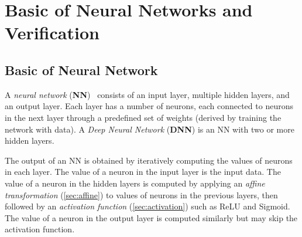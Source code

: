 \part{Basic of Neural Networks and Verification}
\chapter{Basic of Neural Network}\label{sec:basic}

A \emph{neural network} (\textbf{NN})~\cite{Goodfellow-et-al-2016} consists of an input layer, multiple hidden layers, and an output layer. Each layer has a number of neurons, each connected to neurons in the next layer through a predefined set of weights (derived by training the network with data). A \emph{Deep Neural Network} (\textbf{DNN}) is an NN with two or more hidden layers. 


The output of an NN is obtained by iteratively computing  the  values  of  neurons  in  each  layer.
The value of a neuron in the input layer is the input data. The value of a neuron in the hidden layers is computed by applying an \emph{affine transformation} (\autoref{sec:affine}) to values of neurons in the previous layers, then followed by an \emph{activation function} (\autoref{sec:activation}) such as ReLU and Sigmoid. The value of a neuron in the output layer is computed similarly but may skip the activation function.



